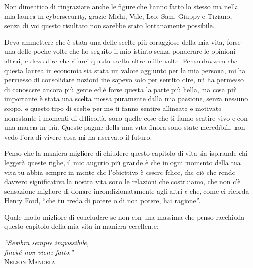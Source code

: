 \documentclass[12pt, a4paper]{report}
\begin{document}
Non dimentico di ringraziare anche le figure che hanno fatto lo stesso ma nella mia laurea in cybersecurity, grazie Michi, Vale, Leo, Sam, Giuppy e Tiziano, senza di voi questo risultato non sarebbe stato lontanamente possibile.
\par
\vspace{\baselineskip}
Devo ammettere che è stata una delle scelte più coraggiose della mia vita, forse una delle poche volte che ho seguito il mio istinto senza ponderare le opinioni altrui, e devo dire che rifarei questa scelta altre mille volte. Penso davvero che questa laurea in economia sia stata un valore aggiunto per la mia persona, mi ha permesso di consolidare nozioni che sapevo solo per sentito dire, mi ha permesso di conoscere ancora più gente ed è forse questa la parte più bella, ma cosa più importante è stata una scelta mossa puramente dalla mia passione, senza nessuno scopo, e questo tipo di scelte per me ti fanno sentire allineato e motivato nonostante i momenti di difficoltà, sono quelle cose che ti fanno sentire vivo e con una marcia in più. Queste pagine della mia vita finora sono state incredibili, non vedo l'ora di vivere cosa mi ha riservato il futuro.

Penso che la maniera migliore di chiudere questo capitolo di vita sia ispirando chi leggerà queste righe, il mio augurio più grande è che in ogni momento della tua vita tu abbia sempre in mente che l'obiettivo è essere felice, che ciò che rende davvero significativa la nostra vita sono le relazioni che costruiamo, che non c'è sensazione migliore di donare incondizionatamente agli altri e che, come ci ricorda Henry Ford, ``che tu creda di potere o di non potere, hai ragione''. 
\par
Quale modo migliore di concludere se non con una massima che penso racchiuda questo capitolo della mia vita in maniera eccellente:

\begin{center}
{\Large\itshape ``Sembra sempre impossibile,\\[0.35em] finché non viene fatto.''}\\[1em]
{\normalsize\scshape Nelson Mandela}\\[1em]
\end{center}

\vfill
\end{document}
